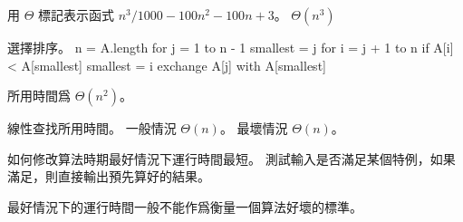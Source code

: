 \startsection[
  title={Analyzing algorithms},
]

\startEXERCISE
用 $\Theta$ 標記表示函式 $n^3 / 1000 - 100 n^2 - 100 n + 3$。
\stopEXERCISE
\startANSWER
$\Theta(n^3)$
\stopANSWER

\startEXERCISE
選擇排序。
\stopEXERCISE
\startANSWER
\startCLRS
n = A.length
for j = 1 to n - 1
	smallest = j
	for i = j + 1 to n
		if A[i] < A[smallest]
			smallest = i
	exchange A[j] with A[smallest]
\stopCLRS

所用時間爲 $\Theta(n^2)$。
\stopANSWER

\startEXERCISE
線性查找所用時間。
\stopEXERCISE
\startANSWER
一般情況 $\Theta(n)$。
最壞情況 $\Theta(n)$。
\stopANSWER

\startEXERCISE
如何修改算法時期最好情況下運行時間最短。
\stopEXERCISE
\startANSWER
測試輸入是否滿足某個特例，如果滿足，則直接輸出預先算好的結果。

最好情況下的運行時間一般不能作爲衡量一個算法好壞的標準。
\stopANSWER

\stopsection
